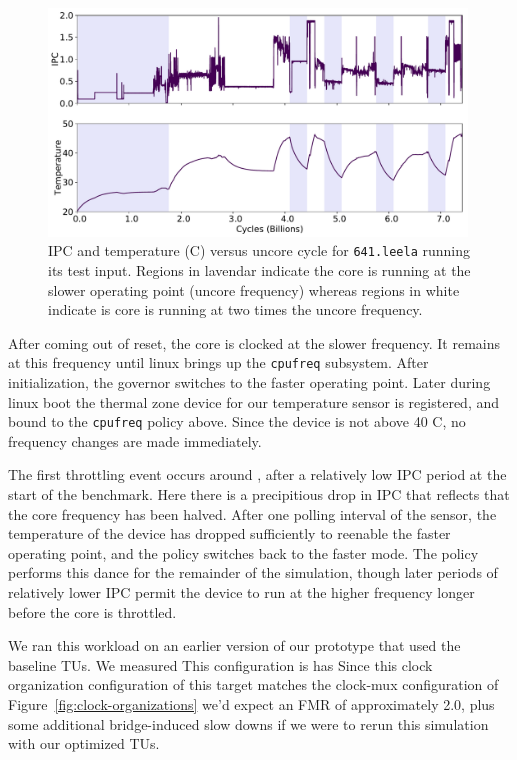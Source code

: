 \begin{figure}
    \centering
    \includegraphics[width=0.99\textwidth]{figures/pdes-demo-plot.pdf}
    \caption{IPC and temperature (C) versus uncore cycle for \texttt{641.leela} running its 
    test input. Regions in lavendar indicate the core is running at the slower operating point (uncore frequency)
    whereas regions in white indicate is core is running at two times the uncore frequency.}
    \label{fig:pdes-demo-plot}
\end{figure}

After coming out of reset, the core is clocked at the slower frequency. It
remains at this frequency until linux brings up the \texttt{cpufreq} subsystem.
After initialization, the governor switches to the faster operating point.
Later during linux boot the thermal zone device for our temperature sensor is
registered, and bound to the \texttt{cpufreq} policy above. Since the device is
not above 40 C, no frequency changes are made immediately.

The first throttling event occurs around \TODO{}, after a relatively low IPC
period at the start of the benchmark. Here there is a precipitious drop in IPC
that reflects that the core frequency has been halved. After one polling
interval of the sensor, the temperature of the device has dropped sufficiently
to reenable the faster operating point, and the policy switches back to the
faster mode. The policy performs this dance for the remainder of the
simulation, though later periods of relatively lower IPC permit the device to
run at the higher frequency longer before the core is throttled.

We ran this workload on an earlier version of our prototype that used the
baseline TUs. We measured This configuration is  has Since this clock
organization configuration of this target matches the clock-mux configuration
of Figure~\ref{fig:clock-organizations} we'd expect an FMR of approximately
2.0, plus some additional bridge-induced slow downs if we were to rerun this
simulation with our optimized TUs.

